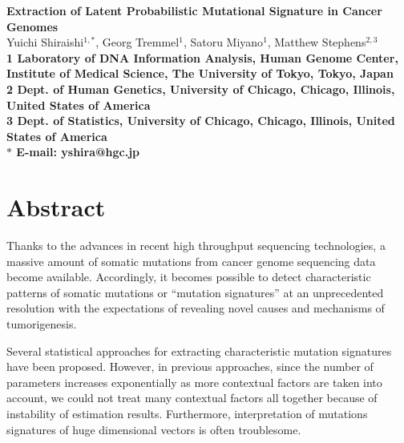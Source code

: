 \date{}

\pagestyle{myheadings}







\begin{flushleft}
{\Large
\textbf{Extraction of Latent Probabilistic Mutational Signature in Cancer Genomes}
}
\\
Yuichi Shiraishi$^{1,\ast}$, 
Georg Tremmel$^{1}$, 
Satoru Miyano$^{1}$, 
Matthew Stephens$^{2,3}$
\\
\bf{1} Laboratory of DNA Information Analysis, Human Genome Center, Institute of Medical Science, The University of Tokyo, Tokyo, Japan
\\
\bf{2} Dept. of Human Genetics, University of Chicago, Chicago, Illinois, United States of America
\\
\bf{3} Dept. of Statistics, University of Chicago, Chicago, Illinois, United States of America
\\
$\ast$ E-mail: yshira@hgc.jp
\end{flushleft}

\section*{Abstract}

Thanks to the advances in  recent high throughput sequencing technologies,
a massive amount of somatic mutations from cancer genome sequencing data become available.
Accordingly, it becomes possible to detect characteristic patterns of somatic mutations or ``mutation signatures'' 
at an unprecedented resolution with the expectations of revealing novel causes and mechanisms of tumorigenesis.

Several statistical approaches for extracting characteristic mutation signatures have been proposed.
However, in previous approaches,
since the number of parameters increases exponentially as more contextual factors are taken into account,
we could not treat many contextual factors all together because of instability of estimation results.
Furthermore, interpretation of mutations signatures of huge dimensional vectors is often troublesome.


